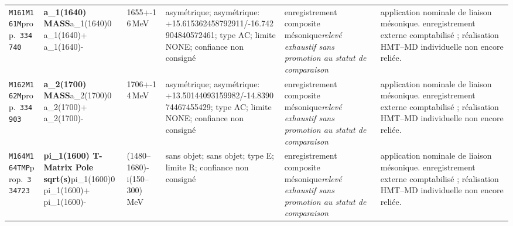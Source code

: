 \begin{landscape}
\begin{longtable}{L{1.85cm}L{4.45cm}L{2.35cm}L{4.05cm}L{3.35cm}L{7.15cm}}
\texttt{M161}\newline \texttt{M161M}\newline prop.\ \texttt{334740} & \textbf{a\_\allowbreak{}1(1640) MASS}\newline a\_\allowbreak{}1(1640)0 \textbar{}\allowbreak{} a\_\allowbreak{}1(1640)+ \textbar{}\allowbreak{} a\_\allowbreak{}1(1640)- & 1655+-16\,MeV & asymétrique; asymétrique: +15.615362458792911/-16.742904840572461; type AC; limite NONE; confiance non consigné & enregistrement composite mésonique\newline \emph{relevé exhaustif sans promotion au statut de comparaison} & application nominale de liaison mésonique. enregistrement externe comptabilisé ; réalisation HMT--MD individuelle non encore reliée. \\
\texttt{M162}\newline \texttt{M162M}\newline prop.\ \texttt{334903} & \textbf{a\_\allowbreak{}2(1700) MASS}\newline a\_\allowbreak{}2(1700)0 \textbar{}\allowbreak{} a\_\allowbreak{}2(1700)+ \textbar{}\allowbreak{} a\_\allowbreak{}2(1700)- & 1706+-14\,MeV & asymétrique; asymétrique: +13.50144093159982/-14.839074467455429; type AC; limite NONE; confiance non consigné & enregistrement composite mésonique\newline \emph{relevé exhaustif sans promotion au statut de comparaison} & application nominale de liaison mésonique. enregistrement externe comptabilisé ; réalisation HMT--MD individuelle non encore reliée. \\
\texttt{M164}\newline \texttt{M164TMP}\newline prop.\ \texttt{334723} & \textbf{pi\_\allowbreak{}1(1600) T-Matrix Pole sqrt(s)}\newline pi\_\allowbreak{}1(1600)0 \textbar{}\allowbreak{} pi\_\allowbreak{}1(1600)+ \textbar{}\allowbreak{} pi\_\allowbreak{}1(1600)- & (1480--1680)-i(150--300)\,MeV & sans objet; sans objet; type E; limite R; confiance non consigné & enregistrement composite mésonique\newline \emph{relevé exhaustif sans promotion au statut de comparaison} & application nominale de liaison mésonique. enregistrement externe comptabilisé ; réalisation HMT--MD individuelle non encore reliée. \\

\end{longtable}
\end{landscape}
